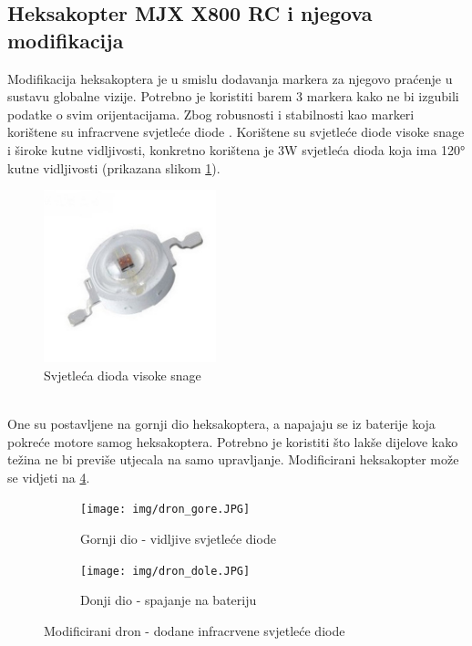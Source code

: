 \documentclass[times, utf8, diplomski]{fer}
\begin{document}
\subsection{Heksakopter MJX X800 RC i njegova modifikacija}\label{sec:heksakopter}
Modifikacija heksakoptera je u smislu dodavanja markera za njegovo praćenje u sustavu globalne vizije. Potrebno je koristiti barem 3 markera kako ne bi izgubili podatke o svim orijentacijama. Zbog robusnosti i stabilnosti kao markeri korištene su infracrvene  svjetleće diode . Korištene su svjetleće diode visoke snage i široke kutne vidljivosti, konkretno korištena je 3W svjetleća dioda koja ima \ang{120} kutne vidljivosti (prikazana slikom \ref{fig:LED}). \\
\begin{figure}[htb]
\centering
\includegraphics[width=5cm]{img/LED.png}
\caption{Svjetleća dioda visoke snage\protect\footnotemark}
\label{fig:LED}
\end{figure}\\
One su postavljene na gornji dio heksakoptera, a napajaju se iz baterije koja pokreće motore samog heksakoptera. Potrebno je koristiti što lakše dijelove kako težina ne bi previše utjecala na samo upravljanje. Modificirani heksakopter može se vidjeti na \ref{fig:modificirani dron}.
\begin{figure}[htb]
\centering
\begin{subfigure}{.48\textwidth}
  \centering
  \texttt{[image: img/dron\_gore.JPG]}
  \caption{Gornji dio - vidljive svjetleće diode}
  \label{fig:gornji}
\end{subfigure}
\begin{subfigure}{.48\textwidth}
  \centering
  \texttt{[image: img/dron\_dole.JPG]}
  \caption{Donji dio - spajanje na bateriju}
  \label{fig:donji}
\end{subfigure}
\caption{Modificirani dron - dodane infracrvene svjetleće diode}
\label{fig:modificirani dron}
\end{figure}
\end{document}

